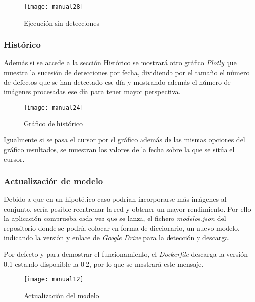     \begin{figure}[htb]
	\centering
	\texttt{[image: manual28]}
	\caption[Ejecución sin detecciones]{Ejecución sin detecciones}
    \end{figure}

\clearpage

\subsubsection{Histórico}

Además si se accede a la sección Histórico se mostrará otro gráfico \emph{Plotly} que muestra la sucesión de detecciones por fecha, dividiendo por el tamaño el número de defectos que se han detectado ese día y mostrando además el número de imágenes procesadas ese día para tener mayor perspectiva.

    \begin{figure}[htb]
	\centering
	\texttt{[image: manual24]}
	\caption[Gráfico de histórico]{Gráfico de histórico}
    \end{figure}

Igualmente si se pasa el cursor por el gráfico además de las mismas opciones del gráfico resultados, se muestran los valores de la fecha sobre la que se sitúa el cursor.

\clearpage

\subsubsection{Actualización de modelo}

Debido a que en un hipotético caso podrían incorporarse más imágenes al conjunto, sería posible reentrenar la red y obtener un mayor rendimiento. Por ello la aplicación comprueba cada vez que se lanza, el fichero \emph{modelos.json} del repositorio donde se podría colocar en forma de diccionario, un nuevo modelo, indicando la versión y enlace de \emph{Google Drive} para la detección y descarga.

Por defecto y para demostrar el funcionamiento, el \emph{Dockerfile} descarga la versión 0.1 estando disponible la 0.2, por lo que se mostrará este mensaje.

    \begin{figure}[htb]
	\centering
	\texttt{[image: manual12]}
	\caption[Actualización del modelo]{Actualización del modelo}
    \end{figure}

